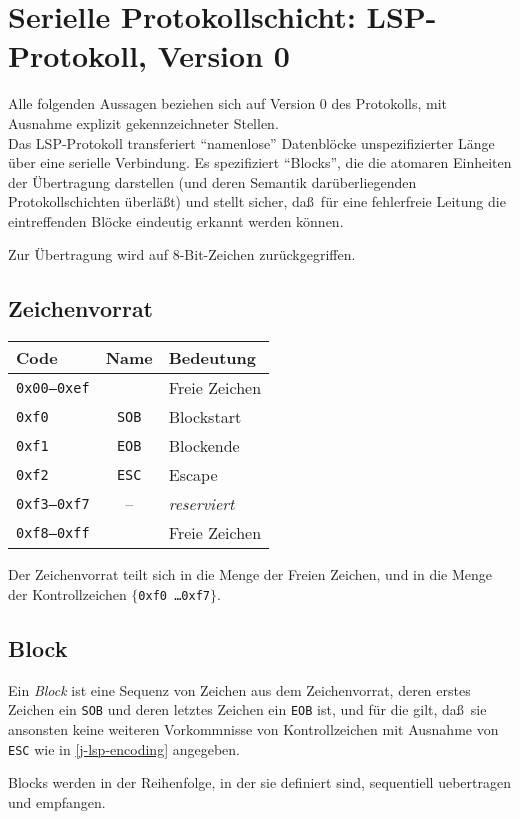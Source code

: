 \chapter{Serielle Protokollschicht: LSP-Protokoll, Version 0}

Alle folgenden Aussagen beziehen sich auf Version 0 des Protokolls, mit Ausnahme
explizit gekennzeichneter Stellen.\\

Das LSP-Protokoll transferiert ``namenlose'' Datenbl\"ocke unspezifizierter
L\"ange \"uber eine serielle Verbindung. Es spezifiziert ``Blocks'', die die
atomaren Einheiten der \"Ubertragung darstellen (und deren Semantik dar\"uberliegenden
Protokollschichten \"uberl\"a\ss t) und stellt sicher, da\ss\ f\"ur eine fehlerfreie
Leitung die eintreffenden Bl\"ocke eindeutig erkannt werden k\"onnen.

Zur \"Ubertragung wird auf 8-Bit-Zeichen zur\"uckgegriffen.

\section{Zeichenvorrat}
\begin{tabular}{l|c|l}
{\bf Code} & {\bf Name} & {\bf Bedeutung} \\
\hline
{\tt 0x00--0xef} & & Freie Zeichen \\
{\tt 0xf0} & {\tt SOB} & Blockstart \\
{\tt 0xf1} & {\tt EOB} & Blockende \\
{\tt 0xf2} & {\tt ESC} & Escape \\
{\tt 0xf3--0xf7} & -- & {\it reserviert} \\
{\tt 0xf8--0xff} & & Freie Zeichen \\
\end{tabular}

Der Zeichenvorrat teilt sich in die Menge der Freien Zeichen, und in
die Menge der Kontrollzeichen $\{${\tt 0xf0 \ldots 0xf7}$\}$.

\section{Block}
Ein {\it Block} ist eine Sequenz von Zeichen aus dem Zeichenvorrat, deren erstes
Zeichen ein {\tt SOB} und deren letztes Zeichen ein {\tt EOB} ist, und f\"ur die
gilt, da\ss\ sie ansonsten keine weiteren Vorkommnisse von Kontrollzeichen mit Ausnahme
von {\tt ESC} wie in \ref{j-lsp-encoding} angegeben.

Blocks werden in der Reihenfolge, in der sie definiert sind, sequentiell uebertragen und
empfangen.

